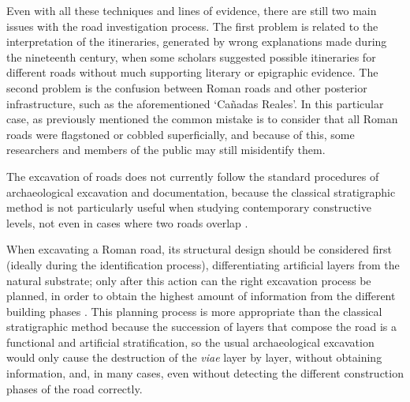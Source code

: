 	Even with all these techniques and lines of evidence, there are still two main issues with the road investigation process. The first problem is related to the interpretation of the itineraries, generated by wrong explanations made during the nineteenth century, when some scholars suggested possible itineraries for different roads \parencite[47]{Beltrán_1990} without much supporting literary or epigraphic evidence. The second problem is the confusion between Roman roads and other posterior infrastructure, such as the aforementioned ‘Cañadas Reales’. In this particular case, as previously mentioned the common mistake is to consider that all Roman roads were flagstoned or cobbled superficially, and because of this, some researchers and members of the public may still misidentify them.
	
	
	The excavation of roads does not currently follow the standard procedures of archaeological excavation and documentation, because the classical stratigraphic method is not particularly useful when studying contemporary constructive levels, not even in cases where two roads overlap \parencite[36]{Moreno_2009}.
	
	When excavating a Roman road, its structural design should be considered first (ideally during the identification process), differentiating artificial layers from the natural substrate; only after this action can the right excavation process be planned, in order to obtain the highest amount of information from the different building phases \parencite[49]{Palomino_2010}. This planning process is more appropriate than the classical stratigraphic method because the succession of layers that compose the road is a functional and artificial stratification, so the usual archaeological excavation would only cause the destruction of the \textit{viae} layer by layer, without obtaining information, and, in many cases, even without detecting the different construction phases of the road correctly.
	
